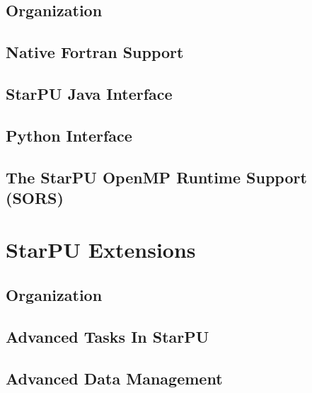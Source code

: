 \chapter{Organization}
\label{IntroLanguage}
\hypertarget{IntroLanguage}{}


\chapter{Native Fortran Support}
\label{NativeFortranSupport}
\hypertarget{NativeFortranSupport}{}


\chapter{StarPU Java Interface}
\label{StarPUJavaInterface}
\hypertarget{StarPUJavaInterface}{}


\chapter{Python Interface}
\label{PythonInterface}
\hypertarget{PythonInterface}{}


\chapter{The StarPU OpenMP Runtime Support (SORS)}
\label{OpenMPRuntimeSupport}
\hypertarget{OpenMPRuntimeSupport}{}


\part{StarPU Extensions}

\chapter{Organization}
\label{IntroExtensions}
\hypertarget{IntroExtensions}{}


\chapter{Advanced Tasks In StarPU}
\label{AdvancedTasksInStarPU}
\hypertarget{AdvancedTasksInStarPU}{}


\chapter{Advanced Data Management}
\label{AdvancedDataManagement}
\hypertarget{AdvancedDataManagement}{}


